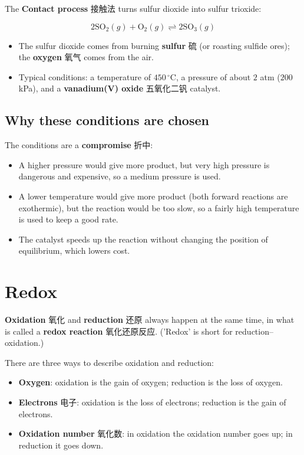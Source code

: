 \documentclass[11pt]{article}
\begin{document}
The \textbf{Contact process} 接触法 turns sulfur dioxide into sulfur trioxide:

\[
2\text{SO}_2(g) + \text{O}_2(g) \rightleftharpoons 2\text{SO}_3(g)
\]

\begin{itemize}
\item The sulfur dioxide comes from burning \textbf{sulfur} 硫 (or roasting sulfide ores); the \textbf{oxygen} 氧气 comes from the air.

\item Typical conditions: a temperature of $450\,^{\circ}\text{C}$, a pressure of about $2$ atm ($200$ kPa), and a \textbf{vanadium(V) oxide} 五氧化二钒 catalyst.

\end{itemize}

\subsection*{Why these conditions are chosen}

The conditions are a \textbf{compromise} 折中:

\begin{itemize}
\item A higher pressure would give more product, but very high pressure is dangerous and expensive, so a medium pressure is used.

\item A lower temperature would give more product (both forward reactions are exothermic), but the reaction would be too slow, so a fairly high temperature is used to keep a good rate.

\item The catalyst speeds up the reaction without changing the position of equilibrium, which lowers cost.

\end{itemize}

\section*{Redox}

\textbf{Oxidation} 氧化 and \textbf{reduction} 还原 always happen at the same time, in what is called a \textbf{redox reaction} 氧化还原反应. ('Redox' is short for reduction–oxidation.)

There are three ways to describe oxidation and reduction:

\begin{itemize}
\item \textbf{Oxygen}: oxidation is the gain of oxygen; reduction is the loss of oxygen.

\item \textbf{Electrons} 电子: oxidation is the loss of electrons; reduction is the gain of electrons.

\item \textbf{Oxidation number} 氧化数: in oxidation the oxidation number goes up; in reduction it goes down.

\end{itemize}
\end{document}
